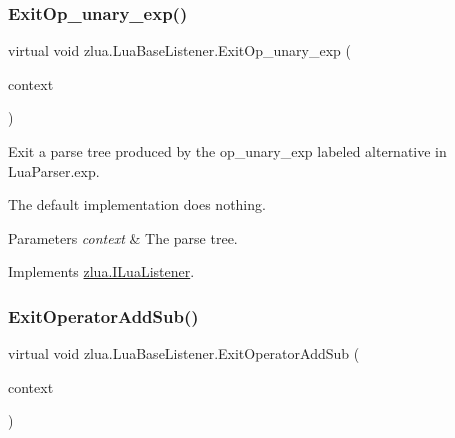 \subsubsection{\texorpdfstring{Exit\+Op\+\_\+unary\+\_\+exp()}{ExitOp\_unary\_exp()}}
{\footnotesize\ttfamily virtual void zlua.\+Lua\+Base\+Listener.\+Exit\+Op\+\_\+unary\+\_\+exp (\begin{DoxyParamCaption}\item[{\mbox{[}\+Not\+Null\mbox{]} \mbox{\hyperlink{classzlua_1_1_lua_parser_1_1_op__unary__exp_context}{Lua\+Parser.\+Op\+\_\+unary\+\_\+exp\+Context}}}]{context }\end{DoxyParamCaption})\hspace{0.3cm}{\ttfamily [virtual]}}



Exit a parse tree produced by the {\ttfamily op\+\_\+unary\+\_\+exp} labeled alternative in Lua\+Parser.\+exp. 

The default implementation does nothing.


\begin{DoxyParams}{Parameters}
{\em context} & The parse tree.\\
\hline
\end{DoxyParams}


Implements \mbox{\hyperlink{interfacezlua_1_1_i_lua_listener_a16b9b227b375c5bbe949db6e101f2dce}{zlua.\+I\+Lua\+Listener}}.

\mbox{\label{classzlua_1_1_lua_base_listener_aa8686e94c0d6dbf3292a7ed77baa54b5}} 
\subsubsection{\texorpdfstring{Exit\+Operator\+Add\+Sub()}{ExitOperatorAddSub()}}
{\footnotesize\ttfamily virtual void zlua.\+Lua\+Base\+Listener.\+Exit\+Operator\+Add\+Sub (\begin{DoxyParamCaption}\item[{\mbox{[}\+Not\+Null\mbox{]} \mbox{\hyperlink{classzlua_1_1_lua_parser_1_1_operator_add_sub_context}{Lua\+Parser.\+Operator\+Add\+Sub\+Context}}}]{context }\end{DoxyParamCaption})\hspace{0.3cm}{\ttfamily [virtual]}}



